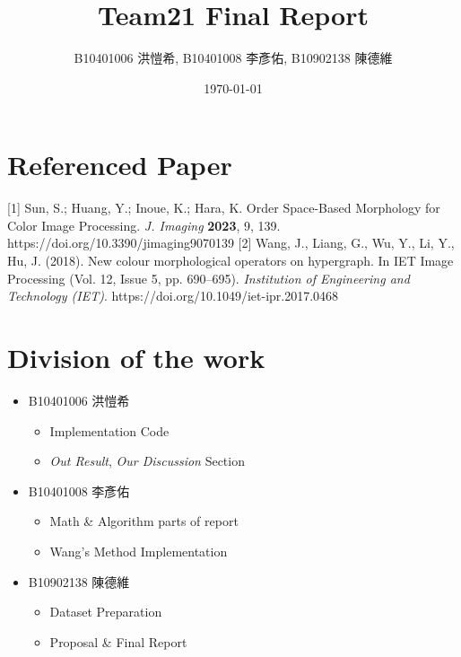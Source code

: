\documentclass[12pt,a4paper]{article}
\title{Team21 Final Report}
\author{B10401006 洪愷希, B10401008 李彥佑, B10902138 陳德維}   %
\date{\today}   %
\begin{document}
\begin{titlepage}
    \maketitle
    \thispagestyle{empty}
\end{titlepage}

% 

% 


\clearpage



\section*{Referenced Paper}
 [1] Sun, S.; Huang, Y.; Inoue, K.; Hara, K. Order Space-Based Morphology for Color Image Processing. \textit{J. Imaging} \textbf{2023}, 9, 139. https://doi.org/10.3390/jimaging9070139
[2] Wang, J., Liang, G., Wu, Y., Li, Y., Hu, J. (2018). New colour morphological operators on hypergraph. In IET Image Processing (Vol. 12, Issue 5, pp. 690–695). \textit{Institution of Engineering and Technology (IET)}. https://doi.org/10.1049/iet-ipr.2017.0468


\section*{Division of the work}
\begin{itemize}
    \item B10401006 洪愷希
          \begin{itemize}
              \item Implementation Code
              \item \textit{Out Result}, \textit{Our Discussion} Section
          \end{itemize}
    \item B10401008 李彥佑
          \begin{itemize}
              \item Math \& Algorithm parts of report
              \item Wang's Method Implementation
          \end{itemize}
    \item B10902138 陳德維
          \begin{itemize}
              \item Dataset Preparation
              \item Proposal \& Final Report
          \end{itemize}
\end{itemize}
\end{document}
